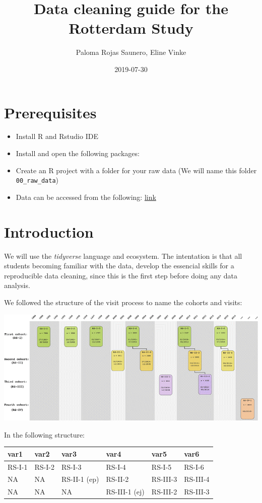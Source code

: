 \documentclass[]{book}
\title{Data cleaning guide for the Rotterdam Study}
\author{Paloma Rojas Saunero, Eline Vinke}
\date{2019-07-30}
\begin{document}
\maketitle

{
\setcounter{tocdepth}{1}
\tableofcontents
}
\hypertarget{prerequisites}{%
\chapter{Prerequisites}\label{prerequisites}}

\begin{itemize}
\item
  Install R and Rstudio IDE
\item
  Install and open the following packages:
\item
  Create an R project with a folder for your raw data (We will name this folder \texttt{00\_raw\_data})
\item
  Data can be accessed from the following: \href{https://epi-wiki.erasmusmc.nl/wiki/ergowiki/index.php/Ergobasics}{link}
\end{itemize}

\hypertarget{intro}{%
\chapter{Introduction}\label{intro}}

We will use the \emph{tidyverse} language and ecosystem.
The intentation is that all students becoming familiar with the data, develop the essencial skills for a reproducible data cleaning, since this is the first step before doing any data analysis.

We followed the structure of the visit process to name the cohorts and visits:

\includegraphics[width=1\linewidth]{./rs}

In the following structure:

\begin{tabular}{l|l|l|l|l|l}
\hline
var1 & var2 & var3 & var4 & var5 & var6\\
\hline
RS-I-1 & RS-I-2 & RS-I-3 & RS-I-4 & RS-I-5 & RS-I-6\\
\hline
NA & NA & RS-II-1 (ep) & RS-II-2 & RS-III-3 & RS-III-4\\
\hline
NA & NA & NA & RS-III-1 (ej) & RS-III-2 & RS-III-3\\
\hline
\end{tabular}
\end{document}
